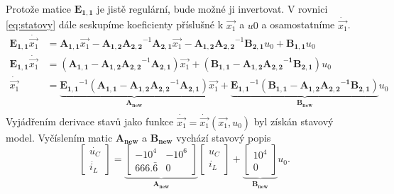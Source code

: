 \documentclass[twoside]{article}
\begin{document}
Protože matice $\mathbf{E_{1,1}}$ je jistě regulární, bude možné ji invertovat. V rovnici \eqref{eq:statovy} dále seskupíme koeficienty
příslušné k $\vec{x_1}$ a $u0$ a osamostatníme $\dot{\vec{x_1}}$.
\begin{equation}
	\begin{split}
		\mathbf{E_{1,1}} \dot{\vec{x_1}}  &= \mathbf{A_{1,1}} \vec{x_1} - \mathbf{A_{1,2}} \mathbf{A_{2,2}}^{-1} \mathbf{A_{2,1}} \vec{x_1} - \mathbf{A_{1,2}} \mathbf{A_{2,2}}^{-1} \mathbf{B_{2,1}} u_0 + \mathbf{B_{1,1}} u_0 \\
		\mathbf{E_{1,1}} \dot{\vec{x_1}}  &= (\mathbf{A_{1,1}} - \mathbf{A_{1,2}} \mathbf{A_{2,2}}^{-1} \mathbf{A_{2,1}}) \vec{x_1} + (\mathbf{B_{1,1} - \mathbf{A_{1,2}} \mathbf{A_{2,2}}^{-1} \mathbf{B_{2,1}}}) u_0 \\
		\dot{\vec{x_1}}  &= \underbrace{\mathbf{E_{1,1}}^{-1}(\mathbf{A_{1,1}} - \mathbf{A_{1,2}} \mathbf{A_{2,2}}^{-1} \mathbf{A_{2,1}})}_{\mathbf{A_{\text{new}}}} \vec{x_1} + \underbrace{\mathbf{E_{1,1}}^{-1}(\mathbf{B_{1,1} - \mathbf{A_{1,2}} \mathbf{A_{2,2}}^{-1} \mathbf{B_{2,1}}})}_{\mathbf{B_{\text{new}}}} u_0 \\
	\end{split}
\end{equation}
Vyjádřením derivace stavů jako funkce $\dot{\vec{x_1}} = \dot{\vec{x_1}}(\vec{x_1}, u_0)$ byl získán stavový model. 
Vyčíslením matic $\mathbf{A_{\text{new}}}$ a $\mathbf{B_{\text{new}}}$ vychází stavový popis 
\begin{equation}
	\begin{bmatrix}
		\dot{u_C} \\
		\dot{i_L}
	\end{bmatrix} = \underbrace{\begin{bmatrix}
	-10^4 & -10^6 \\
	666.\bar{6} & 0	
\end{bmatrix}}_{\mathbf{A_{\text{new}}}} \begin{bmatrix}
	u_C \\ i_L
\end{bmatrix} + \underbrace{\begin{bmatrix}
	10^4 \\ 0
\end{bmatrix}}_{\mathbf{B_{\text{new}}}} u_0.
\end{equation}
\end{document}
